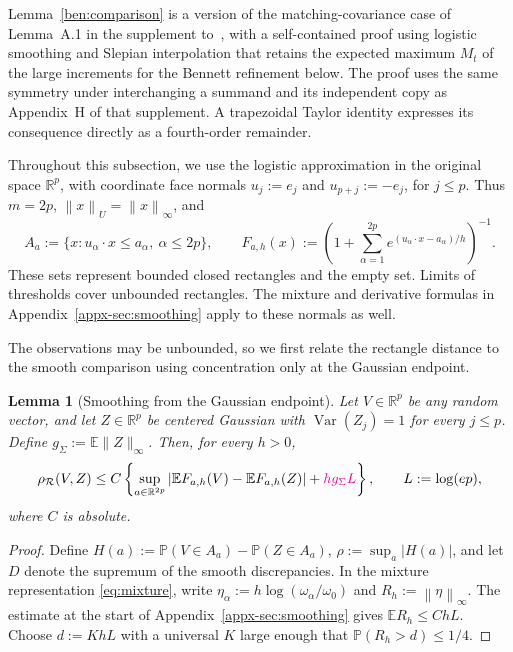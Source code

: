 \documentclass[11pt,letterpaper]{article}
\newenvironment{recovered}{}{}
\newcommand{\vSix}[1]{{\color{magenta}#1}}
\newenvironment{vSixBlock}{\color{magenta}}{}
\newtheorem{lemma}{Lemma}
\theoremstyle{remark}
\newcommand{\E}{\mathbb E}
\newcommand{\Pp}{\mathbb P}
\newcommand{\R}{\mathbb R}
\newcommand{\Var}{\operatorname{Var}}
\newcommand{\norm}[1]{\left\lVert#1\right\rVert}
\newcommand{\rh}{\rho_{\mathcal R}}
\begin{document}
\begin{recovered}
Lemma~\ref{ben:comparison} is a version of the matching-covariance
case of Lemma~A.1 in the supplement to~\cite{CCKK2022}, with a
self-contained proof using logistic smoothing and Slepian interpolation
that retains the expected maximum \(M_t\) of the large increments
for the Bennett refinement below. The proof uses the same symmetry
under interchanging a summand and its independent copy as Appendix~H
of that supplement. A trapezoidal Taylor identity expresses its
consequence directly as a fourth-order remainder.

Throughout this subsection, we use the logistic approximation in the
original space \(\R^p\), with coordinate face normals
\(u_j:=e_j\) and \(u_{p+j}:=-e_j\), for \(j\le p\).
Thus \(m=2p\), \(\norm x_U=\norm x_\infty\), and
\[
 A_a:=\{x:u_\alpha\cdot x\le a_\alpha,\ \alpha\le2p\},\qquad
 F_{a,h}(x):=\left(1+\sum_{\alpha=1}^{2p}
          e^{(u_\alpha\cdot x-a_\alpha)/h}\right)^{-1}.
\]
These sets represent bounded closed rectangles and the empty set.
Limits of thresholds cover unbounded rectangles. The mixture and
derivative formulas in Appendix~\ref{appx-sec:smoothing} apply to
these normals as well.

The observations may be unbounded, so we first relate the rectangle
distance to the smooth comparison using concentration only at the
Gaussian endpoint.

\begin{lemma}[Smoothing from the Gaussian endpoint]\label{ben:smoothing}
Let \(V\in\R^p\) be any random vector, and let \(Z\in\R^p\)
be centered Gaussian with \(\Var(Z_j)=1\) for every \(j\le p\).
\vSix{Define \(g_\Sigma:=\E\|Z\|_\infty\).}
Then, for every \(h>0\),
\begin{equation}\label{ben:gaussian-smoothing}
 \rh(V,Z)\le C\left\{
 \sup_{a\in\R^{2p}}|\E F_{a,h}(V)-\E F_{a,h}(Z)|
       +\vSix{hg_\Sigma L}\right\},\qquad L:=\log(ep),
\end{equation}
where \(C\) is absolute.
\end{lemma}
\begin{proof}
\begin{vSixBlock}
{Define} \(H(a):=\Pp(V\in A_a)-\Pp(Z\in A_a)\),
\(\rho:=\sup_a|H(a)|\), and let \(D\) denote the supremum of
the smooth discrepancies. In the mixture representation
\eqref{eq:mixture}, write
\(\eta_\alpha:=h\log(\omega_\alpha/\omega_0)\) and
\(R_h:=\norm\eta_\infty\). The estimate at the start of
Appendix~\ref{appx-sec:smoothing} gives \(\E R_h\le ChL\).
Choose \(d:=KhL\) with a universal \(K\) large enough that
\(\Pp(R_h>d)\le1/4\).


\end{vSixBlock}
\end{proof}
\end{recovered}
\end{document}
